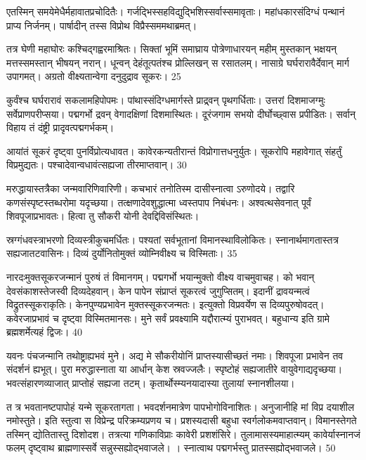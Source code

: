 एतस्मिन् समयेमेधैर्महावातप्रचोदितैः।
गर्जद्भिस्सहविद्युद्भिशिस्सर्वास्समावृताः।
महांधकारसंदिग्धं पन्थानं प्राप्य निर्जनम्।
पार्षादीन् तस्स विप्रोथ विप्रैस्सममथाब्रमत्।

तत्र घेणी महाघोरः कश्चिद्गह्वरमाश्रितः।
सिक्तां भूमिं समाघ्राय पोत्रेणाधारयन् महीम् मुस्तकान् भक्षयन् मत्तस्समस्तान् भीषयन् नरान्।
धून्वन् देहंतूत्पतंश्च प्रोल्लिखन् स रसातलम्।
नासाग्रे घर्घरारावैर्देवान् मार्ग उपागमत्।
अग्रतो वीक्ष्यतान्वेगा दनुदुद्राव सूकरः।
25

कुर्वंश्च घर्घरारावं सकलामहिपोपमः।
पांथास्संदिग्धमार्गस्ते प्राद्र्वन् पृथगर्धिताः।
उत्तरां दिशमाजग्मुः सर्वेप्राणपरीप्सया।
पद्मगर्भो द्रवन् वेगादक्षिणां दिशमास्थितः।
दूरंजगाम सभयो दीर्घोच्छ्वास प्रपीडितः।
सर्वान् विहाय तं दंष्ट्री प्रादृवत्पद्मगर्भकम्।

आयांतं सूकरं दृष्ट्वा पुनर्विप्रोत्यधावत।
कावेरकन्यतीरान्तं विप्रोगात्तधनुर्युतः।
सूकरोपि महावेगात् संहर्तुं विप्रमुद्यतः।
पश्चादेवान्वधावंत्सह्यजा तीरमाप्तवान्।
30

मरुद्धायास्तत्रैका जन्मवारिणिवारिणी।
कचभारं तनोतिस्म दासीस्नात्वा ऽरुणोदये।
तद्वारि कणसंस्पृष्टस्तब्धरोमा यदृच्छया।
तत्क्षणादेवशुद्धात्मा ध्वस्तपाप निबंधनः।
अश्वत्थसेवनात् पूर्वं शिवपूजाप्रभावतः।
हित्वा तु सौकरी योनी देवद्दिविसंस्थितः।

स्रग्गंधवस्त्राभरणो दिव्यस्त्रीकुचमर्धितः।
पश्यतां सर्वभूतानां विमानस्थाविलोकितः।
स्नानार्थमागतास्तत्र सह्यजातटवासिनः।
दिव्यं दुर्योनितोमुक्तं व्योम्निवीक्ष्य च विस्मिताः।
35

नारदःमुक्तसूकरजन्मानं पुरुषं तं विमानगम्।
पद्मगर्भो भयान्मुक्तो वीक्ष्य वाचमुवाचह।
को भवान् देवसंकाशस्तेजस्वी दिव्यदेहवान्।
केन पापेन संप्राप्तं सूकरत्वं जुगुप्सितम्।
इदानीं द्रावयन्मत्वं विद्रुतस्सूकराकृतिः।
केनपुण्यप्रभावेन मुक्तस्सूकरजन्मतः।
इत्युक्तो विप्रवर्येण स दिव्यपुरुषोवदत्।
कवेरजाप्रभावं च दृष्ट्वा विस्मितमानसः।
मुने सर्वं प्रवक्ष्यामि यद्दौरात्म्यं पुराभवत्।
बहुधान्य इति ग्रामे ब्रह्मशर्मेत्यहं द्विजः।
40

यवनः पंचजन्मानि तथोष्ट्राह्यभवं मुने।
अद्य मे सौकरीयोनिं प्राप्तस्यासीच्छतं नमाः।
शिवपूजा प्रभावेन तव संदर्शनं ह्यभूत्।
पुरा मरुद्धास्नाता या आर्धान् केश स्रवज्जलैः।
स्पृष्टोहं सह्यजातीरे वायुवेगाद्यदृच्छया।
भवत्संहारणव्याजात् प्राप्तोहं सह्यजा तटम्।
कृतार्थोस्म्यनयादास्या तुलायां स्नानशीलया।

त
त्र
भवतानष्टपापोहं यन्मे सूकरतागता।
भवदर्शनमात्रेण पापभोगोविनाशितः।
अनुजानीहि मां विप्र दयाशील नमोस्तुते।
इति स्तुत्वा स विप्रेन्द्र परिक्रम्यप्रणय च।
प्रशस्यदासी बहुधा स्वर्गलोकमवाप्तवान्।
विमानस्तेगते तस्मिन् द्योतितास्तु दिशोदश।
तत्रत्या गणिकाविप्राः कावेरी प्रशशंसिरे।
तुलामासस्यमाहात्म्यम् कावेर्यास्नानजं फलम् दृष्ट्वाथ ब्राह्मणास्सर्वे सन्नुस्सह्योद्भवाजले।
।
स्नात्वाथ पद्मगर्भस्तु प्रातस्सह्योद्भवाजले।
50


